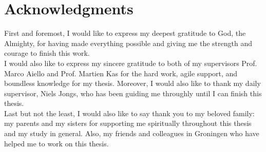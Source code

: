 
\begingroup
\let\clearpage\relax
\let\cleardoublepage\relax
\let\cleardoublepage\relax
\chapter*{Acknowledgments}
First and foremost, I would like to express my deepest gratitude to God, the Almighty, for having made everything possible and giving me the strength and courage to finish this work.\\

\noindent
I would also like to express my sincere gratitude to both of my supervisors Prof. Marco Aiello and Prof. Martien Kas for the hard work, agile support, and boundless knowledge for my thesis. Moreover, I would also like to thank my daily supervisor, Niels Jongs, who has been guiding me throughly until I can finish this thesis.\\

\noindent
Last but not the least, I would also like to say thank you to my beloved family: my parents and my sisters for supporting me spiritually throughout this thesis and my study in general. Also, my friends and colleagues in Groningen who have helped me to work on this thesis.
\endgroup

